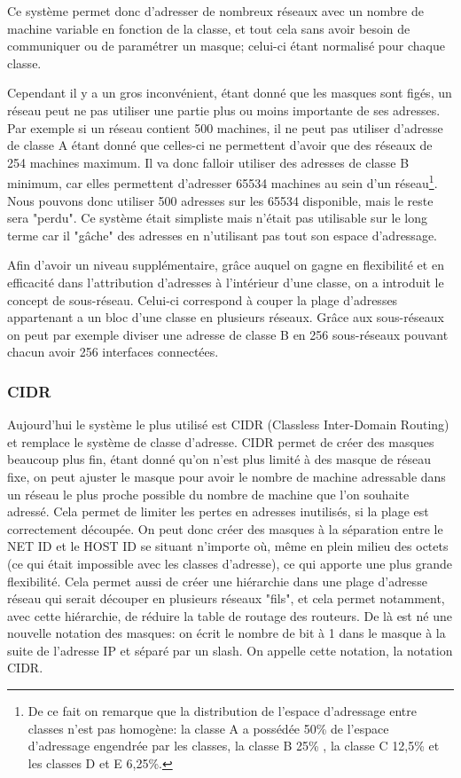 \smallbreak
Ce système permet donc d'adresser de nombreux réseaux avec un nombre de machine
variable en fonction de la classe, et tout cela sans avoir besoin de
communiquer ou de paramétrer un masque; celui-ci étant normalisé pour chaque
classe.  

Cependant il y a un gros inconvénient, étant donné que les masques sont
figés, un réseau peut ne pas utiliser une partie plus ou moins importante
de ses adresses. Par exemple si un réseau contient 500 machines, il ne peut pas
utiliser d'adresse de classe A étant donné que celles-ci ne permettent d'avoir
que des réseaux de 254 machines maximum. Il va donc falloir utiliser des
adresses de classe B minimum, car elles permettent d'adresser 65534 machines au
sein d'un réseau\footnote{
De ce fait on remarque que la distribution de l’espace d’adressage entre
classes n'est pas homogène: la classe A a possédée 50\% de l’espace
d'adressage engendrée par les classes, la classe B 25\% , la classe C 12,5\%  et
les classes D et E 6,25\%.}. Nous pouvons donc utiliser 500 adresses sur les 65534
disponible, mais le reste sera "perdu".  Ce système était simpliste mais
n'était pas utilisable sur le long terme car il "gâche" des adresses en
n'utilisant pas tout son espace d'adressage.

\smallbreak
Afin d'avoir un niveau supplémentaire, grâce auquel on gagne en flexibilité et
en efficacité dans l'attribution d'adresses à l'intérieur d'une classe, on a
introduit le concept de sous-réseau. Celui-ci correspond à couper la plage
d'adresses appartenant a un bloc d'une classe en plusieurs réseaux. Grâce aux
sous-réseaux on peut par exemple diviser une adresse de classe B en 256
sous-réseaux pouvant chacun avoir 256 interfaces connectées. 


\subsubsection{CIDR}

Aujourd'hui le système le plus utilisé est CIDR (Classless Inter-Domain
Routing) et remplace le système de classe d'adresse. CIDR permet de créer des
masques beaucoup plus fin, étant donné qu'on n'est plus limité à des masque de
réseau fixe, on peut ajuster le masque pour avoir le nombre de machine
adressable dans un réseau le plus proche possible du nombre de machine que l'on
souhaite adressé.  Cela permet de limiter les pertes en adresses inutilisés, si
la plage est correctement découpée.  On peut donc créer des masques à la
séparation entre le NET ID et le HOST ID se situant n'importe où, même en plein
milieu des octets (ce qui était impossible avec les classes d'adresse), ce qui
apporte une plus grande flexibilité.  Cela permet aussi de créer une hiérarchie
dans une plage d'adresse réseau qui serait découper en plusieurs réseaux
"fils", et cela permet notamment, avec cette hiérarchie, de réduire la table de
routage des routeurs.  De là est né une nouvelle notation des masques: on écrit
le nombre de bit à 1 dans le masque à la suite de l'adresse IP et séparé par un
slash. On appelle cette notation, la notation CIDR.


